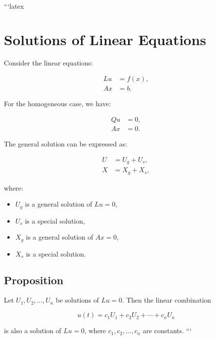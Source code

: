 ```latex
\section*{Solutions of Linear Equations}

Consider the linear equations:

\begin{align}
    Lu &= f(x), \\
    Ax &= b.
\end{align}

For the homogeneous case, we have:

\begin{align}
    Qu &= 0, \\
    Ax &= 0.
\end{align}

The general solution can be expressed as:

\begin{align}
    U &= U_g + U_s, \\
    X &= X_g + X_s,
\end{align}

where:
\begin{itemize}
    \item $U_g$ is a general solution of $Lu = 0$,
    \item $U_s$ is a special solution,
    \item $X_g$ is a general solution of $Ax = 0$,
    \item $X_s$ is a special solution.
\end{itemize}

\subsection*{Proposition}

Let $U_1, U_2, \ldots, U_n$ be solutions of $Lu = 0$. Then the linear combination

\begin{equation}
    u(t) = c_1 U_1 + c_2 U_2 + \cdots + c_n U_n
\end{equation}

is also a solution of $Lu = 0$, where $c_1, c_2, \ldots, c_n$ are constants.
```
